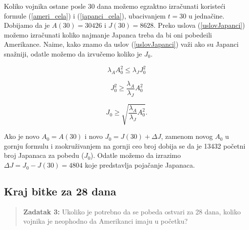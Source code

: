 \documentclass{article}
\begin{document}
\hspace{2mm}
Koliko vojnika ostane posle 30 dana možemo egzaktno izračunati koristeći formule
(\ref{ameri_cela}) i (\ref{japanci_cela}), ubacivanjem \(t = 30\) u jednačine.
Dobijamo da je \(A(30) = 30426\) i \(J(30) = 8628\). Preko uslova
(\ref{uslovJapanci}) možemo izračunati koliko najmanje Japanca treba da bi oni
pobedeili Amerikance. Naime, kako znamo da uslov (\ref{uslovJapanci}) važi ako
su Japanci snažniji, odatle možemo da izvučemo koliko je \(J_0\).

\[
  \lambda_{A}A_0^2 \leq \lambda_{J}J_0^2
\]

\[
  J_0^2 \geq \frac{\lambda_A}{\lambda_J} A_0^2
\]

\[
  J_0 \geq \sqrt{\frac{\lambda_A}{\lambda_J} A_0^2}.
\]

Ako je novo \(A_0 = A(30)\) i novo \(J_0 = J(30) + \Delta J\), zamenom novog \(A_0\) u gornju formulu i zaokruživanjem na gornji ceo broj dobija se da je 13432 početni
broj Japanaca za pobedu (\(J_0\)).
Odatle možemo da izrazimo \(\Delta J = J_0 - J(30) = 4804\) koje predstavlja
pojačanje Japanaca.

\begin{center}
\end{center}

\newpage

\subsection{Kraj bitke za 28 dana}

\vspace{2mm}
\begin{quote}
\textbf{Zadatak 3:}
 Ukoliko je potrebno da se pobeda ostvari za 28 dana, koliko vojnika je
  neophodno da Amerikanci imaju u početku?
\end{quote}
\end{document}
